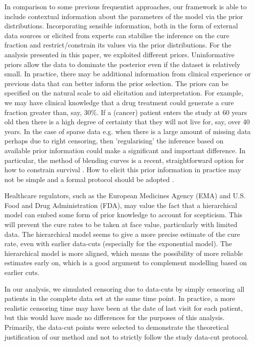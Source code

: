 \documentclass[AMA,STIX1COL]{WileyNJD-v2}
\begin{document}
In comparison to some previous frequentist approaches, our framework is able to include contextual information about the parameters of the model via the prior distributions.
Incorporating sensible information, both in the form of external data sources or elicited from experts can stabilise the inference on the cure fraction and restrict/constrain its values via the prior distributions.
For the analysis presented in this paper, we exploited different priors.
Uninformative priors allow the data to dominate the posterior even if the dataset is relatively small.
In practice, there may be additional information from clinical experience or previous data that can better inform the prior selection.
The priors can be specified on the natural scale to aid elicitation and interpretation.
For example, we may have clinical knowledge that a drug treatment could generate a cure fraction greater than, say, 30\%.
If a (cancer) patient enters the study at 60 years old then there is a high degree of certainty that they will not live for, say, over 40 years.
In the case of sparse data e.g. when there is a large amount of missing data perhaps due to right censoring, then 'regularising' the inference based on available prior information could make a significant and important difference. In particular, the method of blending curves is a recent, straightforward option for how to constrain survival \citep{Che2022}. 
How to elicit this prior information in practice may not be simple and a formal protocol should be adopted \cite{OHagan2019}.

Healthcare regulators, such as the European Medicines Agency (EMA) and U.S. Food and Drug Administration (FDA), may value the fact that a hierarchical model can embed some form of prior knowledge to account for scepticism.
This will prevent the cure rates to be taken at face value, particularly with limited data.
The hierarchical model seems to give a more precise estimate of the cure rate, even with earlier data-cuts (especially for the exponential model).
The hierarchical model is more aligned, which means the possibility of more reliable estimates early on, which is a good argument to complement modelling based on earlier cuts.

In our analysis, we simulated censoring due to data-cuts by simply censoring all patients in the complete data set at the same time point.
In practice, a more realistic censoring time may have been at the date of last visit for each patient, but this would have made no differences for the purposes of this analysis. Primarily, the data-cut points were selected to demonstrate the theoretical justification of our method and not to strictly follow the study data-cut protocol.
\end{document}
